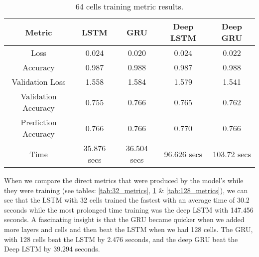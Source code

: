 \documentclass[a4paper,10pt]{article}
\begin{document}
	\begin{table}[b]
		\centering
		\small
		\begin{tabular}[t]{ | c | c | c | c | c | }
			\hline
			Metric              & LSTM  & GRU   & Deep LSTM & Deep GRU \\ 
			\hline
			Loss                & 0.024 & 0.020 & 0.024     & 0.022 \\ 
			\hline
			Accuracy            & 0.987 & 0.988 & 0.987     & 0.988  \\ 
			\hline
			Validation Loss     & 1.558 & 1.584 & 1.579     & 1.541 \\
			\hline
			Validation Accuracy & 0.755 & 0.766 & 0.765     & 0.762 \\
			\hline
			Prediction Accuracy & 0.766     & 0.766 & 0.770     & 0.766  \\ 
			\hline
			Time & 35.876 secs & 36.504 secs & 96.626 secs & 103.72 secs \\ 
			\hline
		\end{tabular}
		\caption{64 cells training metric results.}
		\label{tab:64_metrics}
	\end{table}%
	When we compare the direct metrics that were produced by the model's while they were training (see tables: \ref{tab:32_metrics}, \ref{tab:64_metrics} \& \ref{tab:128_metrics}), we can see that the LSTM with 32 cells trained the fastest with an average time of 30.2 seconds while the most prolonged time training was the deep LSTM with 147.456 seconds. A fascinating insight is that the GRU became quicker when we added more layers and cells and then beat the LSTM when we had 128 cells. The GRU, with 128 cells beat the LSTM by 2.476 seconds, and the deep GRU beat the Deep LSTM by 39.294 seconds.

	

	
\end{document}
